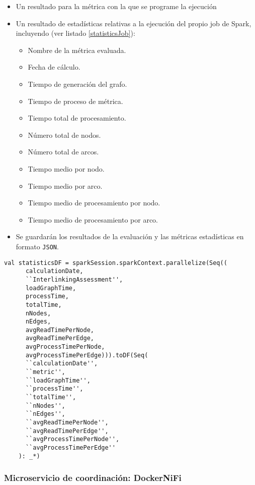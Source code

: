 \begin{itemize}
\item Un resultado para la métrica con la que se programe la ejecución
\item Un resultado de estadísticas relativas a la ejecución del propio job de
  Spark, incluyendo (ver listado \ref{statisticsJob}): 
  \begin{itemize}
  \item Nombre de la métrica evaluada.
  \item Fecha de cálculo.
  \item Tiempo de generación del grafo.
  \item Tiempo de proceso de métrica.
  \item Tiempo total de procesamiento.
  \item Número total de nodos.
  \item Número total de arcos.
  \item Tiempo medio por nodo.
  \item Tiempo medio por arco.
  \item Tiempo medio de procesamiento por nodo.
  \item Tiempo medio de procesamiento por arco.
  \end{itemize}
\item Se guardarán los resultados de la evaluación y las métricas estadísticas
  en formato \texttt{\acs{JSON}}. 

\end{itemize}

\lstset{escapechar=@,language=scala}
\begin{lstlisting}[caption={Campos de salida para las métricas estadísticas
      sobre la evaluación de calidad},captionpos=b, label=statisticsJob]
    val statisticsDF = sparkSession.sparkContext.parallelize(Seq((
      calculationDate,
      ``InterlinkingAssessment'',
      loadGraphTime,
      processTime,
      totalTime,
      nNodes,
      nEdges,
      avgReadTimePerNode,
      avgReadTimePerEdge,
      avgProcessTimePerNode,
      avgProcessTimePerEdge))).toDF(Seq(
      ``calculationDate'',
      ``metric'',
      ``loadGraphTime'',
      ``processTime'',
      ``totalTime'',
      ``nNodes'',
      ``nEdges'',
      ``avgReadTimePerNode'',
      ``avgReadTimePerEdge'',
      ``avgProcessTimePerNode'',
      ``avgProcessTimePerEdge''
    ): _*)
\end{lstlisting}

\subsubsection{Microservicio de coordinación: DockerNiFi}

